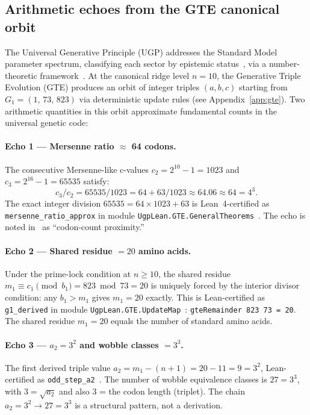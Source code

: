 \documentclass[10pt,twocolumn]{article}
\begin{document}
\subsection{Arithmetic echoes from the GTE canonical orbit}
\label{sec:gte-echoes}

The Universal Generative Principle (UGP) addresses the Standard Model parameter spectrum, classifying each sector by epistemic status~\cite{Spivack2026_SM_UGP}, via a number-theoretic framework~\cite{SpivackUGP,SpivackUGPFormalization}.
At the canonical ridge level $n=10$, the Generative Triple Evolution (GTE)
produces an orbit of integer triples $(a,b,c)$ starting from
$G_1 = (1,\,73,\,823)$ via deterministic update rules (see Appendix~\ref{app:gte}).
Two arithmetic quantities in this orbit approximate fundamental counts in the
universal genetic code:

\paragraph{Echo 1 — Mersenne ratio $\approx$ 64 codons.}
The consecutive Mersenne-like c-values $c_2 = 2^{10}-1 = 1023$ and
$c_3 = 2^{16}-1 = 65535$ satisfy:
\[
c_3 / c_2 = 65535/1023 = 64 + 63/1023 \approx 64.06 \approx 64 = 4^3.
\]
The exact integer division $65535 = 64 \times 1023 + 63$ is
Lean~4-certified as \texttt{mersenne\_ratio\_approx} in module
\texttt{UgpLean.GTE.GeneralTheorems}~\cite{ugp-lean}.
The echo is noted in~\cite{SpivackUGP} as ``codon-count proximity.''

\paragraph{Echo 2 — Shared residue $= 20$ amino acids.}
Under the prime-lock condition at $n \geq 10$, the shared residue
$m_1 \equiv c_1 \pmod{b_1} = 823 \bmod 73 = 20$ is uniquely forced
by the interior divisor condition: any $b_1 > m_1$ gives $m_1 = 20$ exactly.
This is Lean-certified as \texttt{g1\_derived} in module
\texttt{UgpLean.GTE.UpdateMap}~\cite{ugp-lean}:
\texttt{gteRemainder 823 73 = 20}.
The shared residue $m_1 = 20$ equals the number of standard amino acids.

\paragraph{Echo 3 — $a_2 = 3^2$ and wobble classes $= 3^3$.}
The first derived triple value $a_2 = m_1 - (n+1) = 20 - 11 = 9 = 3^2$,
Lean-certified as \texttt{odd\_step\_a2}~\cite{ugp-lean}. The number of
wobble equivalence classes is $27 = 3^3$, with $3 = \sqrt{a_2}$ and also
$3$ = the codon length (triplet). The chain $a_2 = 3^2 \to 27 = 3^3$
is a structural pattern, not a derivation.
\end{document}
